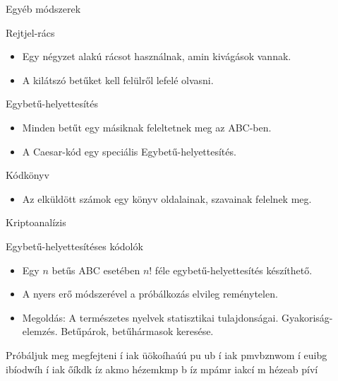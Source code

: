 \documentclass[12 pt]{beamer}
\begin{document}

\begin{frame}{Egyéb módszerek}
  \begin{block}{Rejtjel-rács}
    \begin{itemize}
      \item{Egy négyzet alakú rácsot használnak, amin kivágások vannak.}
      \item{A kilátszó betűket kell felülről lefelé olvasni.}
    \end{itemize}
  \end{block}

  \begin{block}{Egybetű-helyettesítés}
    \begin{itemize}
      \item{Minden betűt egy másiknak feleltetnek meg az ABC-ben.}
      \item{A Caesar-kód egy speciális Egybetű-helyettesítés.}
    \end{itemize}
  \end{block}

  \begin{block}{Kódkönyv}
    \begin{itemize}
      \item{Az elküldött számok egy könyv oldalainak, szavainak felelnek meg.}
    \end{itemize}
  \end{block}

\end{frame}


\begin{frame}{Kriptoanalízis}
  \begin{block}{Egybetű-helyettesítéses kódolók}
    \begin{itemize}
      \item{Egy $n$ betűs ABC esetében $n!$ féle egybetű-helyettesítés készíthető.}
      \item{A nyers erő módszerével a próbálkozás elvileg reménytelen.}
      \item{Megoldás: A természetes nyelvek statisztikai tulajdonságai. Gyakoriság-elemzés. Betűpárok, betűhármasok keresése.}
    \end{itemize}
  \end{block}

  \begin{exampleblock}{Próbáljuk meg megfejteni}
   í iak üökoíhaúú pu ub í iak pmvbznwom í euibg ibíodwíh í iak őíkdk íz akmo hézemkmp b íz mpámr iakcí m hézeab píví 
  \end{exampleblock}
\end{frame}

\end{document}
